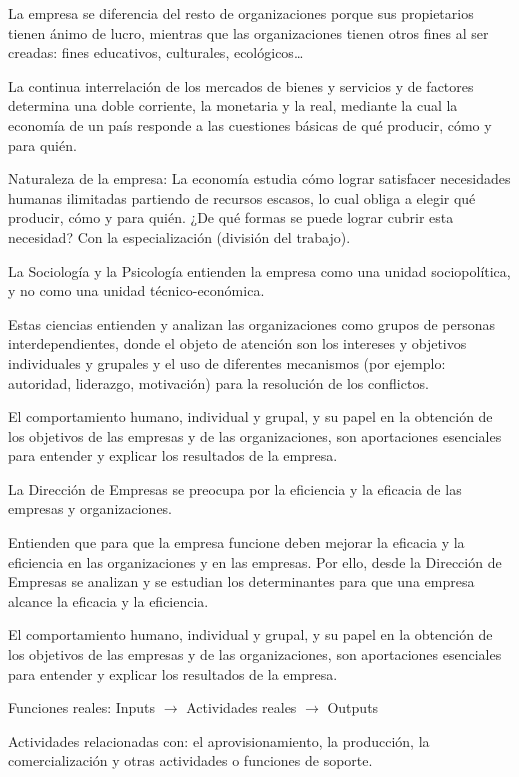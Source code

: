 \documentclass[12pt, twoside, openright]{report} %
\begin{document}
La empresa se diferencia del resto de organizaciones porque sus propietarios tienen ánimo de lucro, mientras que las organizaciones tienen otros fines al ser creadas: fines educativos, culturales, ecológicos…

La continua interrelación de los mercados de bienes y servicios y de factores determina una doble corriente, la monetaria y la real, mediante la cual la economía de un país responde a las cuestiones básicas de qué producir, cómo y para quién.

Naturaleza de la empresa: La economía estudia cómo lograr satisfacer necesidades humanas ilimitadas partiendo de recursos escasos, lo cual obliga a elegir qué producir, cómo y para quién. ¿De qué formas se puede lograr cubrir esta necesidad? Con la especialización (división del trabajo).

La Sociología y la Psicología entienden la empresa como una unidad sociopolítica, y no como una unidad técnico-económica.

Estas ciencias entienden y analizan las organizaciones como grupos de personas interdependientes, donde el objeto de atención son los intereses y objetivos individuales y grupales y el uso de diferentes mecanismos (por ejemplo: autoridad, liderazgo, motivación) para la resolución de los conflictos.

El comportamiento humano, individual y grupal, y su papel en la obtención de los objetivos de las empresas y de las organizaciones, son aportaciones esenciales para entender y explicar los resultados de la empresa.

La Dirección de Empresas se preocupa por la eficiencia y la eficacia de las empresas y organizaciones.

Entienden que para que la empresa funcione deben mejorar la eficacia y la eficiencia en las organizaciones y en las empresas. Por ello, desde la Dirección de Empresas se analizan y se estudian los determinantes para que una empresa alcance la eficacia y la eficiencia.

El comportamiento humano, individual y grupal, y su papel en la obtención de los objetivos de las empresas y de las organizaciones, son aportaciones esenciales para entender y explicar los resultados de la empresa.

Funciones reales: Inputs $\rightarrow$ Actividades reales $\rightarrow$ Outputs

Actividades relacionadas con: el aprovisionamiento, la producción, la comercialización y otras actividades o funciones de soporte.
\end{document}

